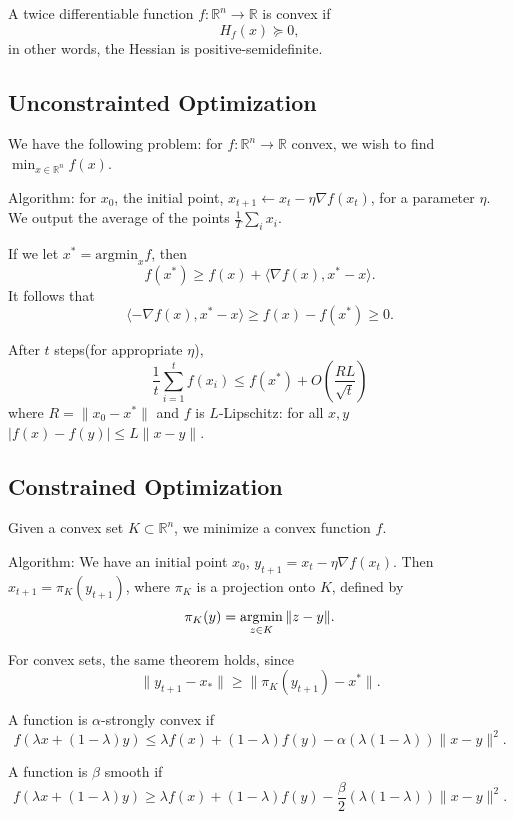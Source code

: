 \documentclass[12pt]{scrartcl}
\newcommand{\R}{\mathbb{R}}
\newcommand{\<}{\langle}
\renewcommand{\>}{\rangle}
\begin{document}
\begin{definition} A twice differentiable function $f: \R^n \to \R$ is convex if $$H_f(x) \succcurlyeq 0,$$
in other words, the Hessian is positive-semidefinite.  
\end{definition}

\subsection{Unconstrainted Optimization}
We have the following problem: for $f: \R^n \to \R$ convex, we wish to find
$\min_{x \in \R^n} f(x)$.

Algorithm: for $x_0$, the initial point, $x_{t+1} \leftarrow x_t - \eta \nabla f(x_t)$, for a parameter $\eta$.  We output the average of the points $\frac{1}{T} \sum_{i} x_i.$

If we let $x^* = \text{argmin}_x f$, then $$f(x^*) \ge  f(x) + \langle \nabla f(x), x^* - x \rangle.$$
It follows that 
$$\langle -\nabla f(x) , x^* - x \rangle \ge f(x) - f(x^*) \ge 0.$$

\begin{thm} After $t$ steps(for appropriate $\eta$), 
$$\frac{1}{t} \sum_{i=1}^t f(x_i) \le f(x^*) + O(\frac{RL}{\sqrt{t}})$$
where $R = \|x_0 - x^* \|$ and $f$ is $L$-Lipschitz: for all $x, y$ $|f(x) - f(y)| \le L \|x - y\|$.
\end{thm}

\subsection{Constrained Optimization}
Given a convex set $K \subset \R^n$, we minimize a convex function $f$.  

Algorithm: We have an initial point $x_0$, $y_{t+1} = x_t - \eta \nabla f(x_t)$. Then $x_{t+1} = \pi_K(y_{t+1})$, where $\pi_K$ is a projection onto $K$, defined by 
$$\pi_K(y) = \operatorname*{arg min}_{z \in K} \|z - y\|.$$

For convex sets, the same theorem holds, since 
$$\|y_{t+1} - x_*\| \ge \|\pi_K(y_{t+1}) - x^*\|.$$

\begin{definition} A function is $\alpha$-strongly convex if 
$$f(\lambda x + (1 - \lambda)y) \le \lambda f(x) + (1 - \lambda )f(y) - \alpha(\lambda(1 - \lambda))\|x - y\|^2.$$
\end{definition}

\begin{definition} A function is $\beta$ smooth if 
$$f(\lambda x + (1 - \lambda )y) \ge \lambda f(x) + (1 - \lambda )f(y) - \frac{\beta}{2} (\lambda(1 - \lambda))\|x - y\|^2.$$
\end{definition}
\end{document}
